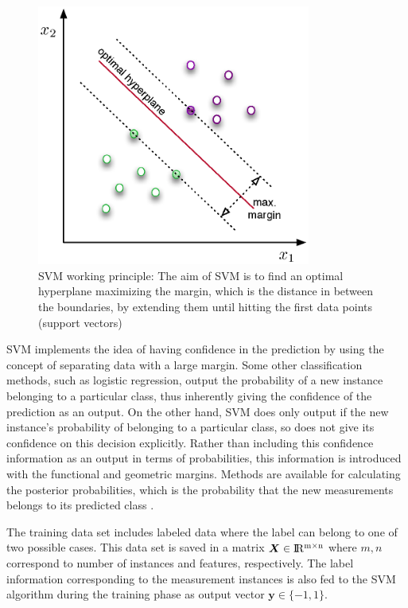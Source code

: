 \begin{figure}
\begin{center}
\includegraphics[width=9cm]{figures/svmHyperplane}    %
\caption{SVM working principle: The aim of SVM is to find an optimal hyperplane maximizing the margin, which is the distance in between the boundaries, by extending them until hitting the first data points (support vectors)} 
\label{fig:svmHyperplane}
\end{center}
\end{figure}

SVM implements the idea of having confidence in the prediction by using the concept of separating data with a large margin. 
Some other classification methods, such as logistic regression, output the probability of a new instance belonging to a particular class, thus inherently giving the confidence of the prediction as an output. 
On the other hand, SVM does only output if the new instance's probability of belonging to a particular class, so does not give its confidence on this decision explicitly. %
Rather than including this confidence information as an output in terms of probabilities, this information is introduced with the functional and geometric margins. 
Methods are available for calculating the posterior probabilities, which is the probability that the new measurements belongs to its predicted class \cite{platt1999probabilistic}. 

The training data set includes labeled data where the label can belong to one of two possible cases. This data set is saved in a matrix $\bm{X} \in {\rm I\!R^{m \times n}}  $ where $m,n$ correspond to number of instances and features, respectively. The label information corresponding to the measurement instances is also fed to the SVM algorithm during the training phase as output vector $\bm{y} \in \{-1,1\}$. 

